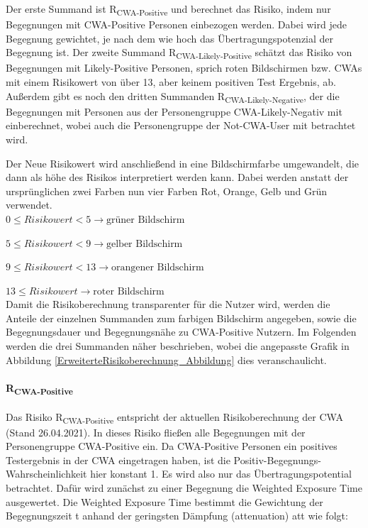 \documentclass[conference]{IEEEtran}
\begin{document}
\centerline{\text{ }}
\centerline{}
\centerline{}
\centerline{\text{ }}

Der erste Summand ist R\textsubscript{CWA-Positive} und berechnet das Risiko, indem nur Begegnungen mit CWA-Positive Personen einbezogen werden. 
Dabei wird jede Begegnung gewichtet, je nach dem wie hoch das Übertragungspotenzial der Begegnung ist. 
Der zweite Summand R\textsubscript{CWA-Likely-Positive} schätzt das Risiko von Begegnungen mit Likely-Positive Personen, sprich roten Bildschirmen bzw. 
CWAs mit einem Risikowert von über 13, aber keinem positiven Test Ergebnis, ab.
Außerdem gibt es noch den dritten Summanden R\textsubscript{CWA-Likely-Negative}, der die Begegnungen mit Personen aus der Personengruppe CWA-Likely-Negativ mit einberechnet,
wobei auch die Personengruppe der Not-CWA-User mit betrachtet wird.

Der Neue Risikowert wird anschließend in eine Bildschirmfarbe umgewandelt, die dann als höhe des Risikos interpretiert werden kann. 
Dabei werden anstatt der ursprünglichen zwei Farben nun vier Farben Rot, Orange, Gelb und Grün verwendet.
\\

$0\le Risikowert < 5 \rightarrow \text{grüner Bildschirm}$

$5\le Risikowert < 9 \rightarrow \text{gelber Bildschirm}$

$9\le Risikowert < 13 \rightarrow \text{orangener Bildschirm}$

$13 \le Risikowert  \rightarrow \text{roter Bildschirm}$
\\

Damit die Risikoberechnung transparenter für die Nutzer wird, werden die Anteile der einzelnen Summanden zum farbigen Bildschirm angegeben, 
sowie die Begegnungsdauer und Begegnungsnähe zu CWA-Positive Nutzern.
Im Folgenden werden die drei Summanden näher beschrieben, wobei die angepasste Grafik in Abbildung \ref{ErweiterteRisikoberechnung_Abbildung} dies veranschaulicht.\\
\paragraph{R\textsubscript{CWA-Positive}}

Das Risiko R\textsubscript{CWA-Positive} entspricht der aktuellen Risikoberechnung der CWA (Stand 26.04.2021). 
In dieses Risiko fließen alle Begegnungen mit der Personengruppe CWA-Positive ein. 
Da CWA-Positive Personen ein positives Testergebnis in der CWA eingetragen haben, ist die Positiv-Begegnungs-Wahrscheinlichkeit hier konstant 1. 
Es wird also nur das Übertragungspotential betrachtet. Dafür wird zunächst zu einer Begegnung die Weighted Exposure Time ausgewertet. 
Die Weighted Exposure Time bestimmt die Gewichtung der Begegnungszeit t anhand der geringsten Dämpfung (attenuation) att  wie folgt: 
\end{document}
